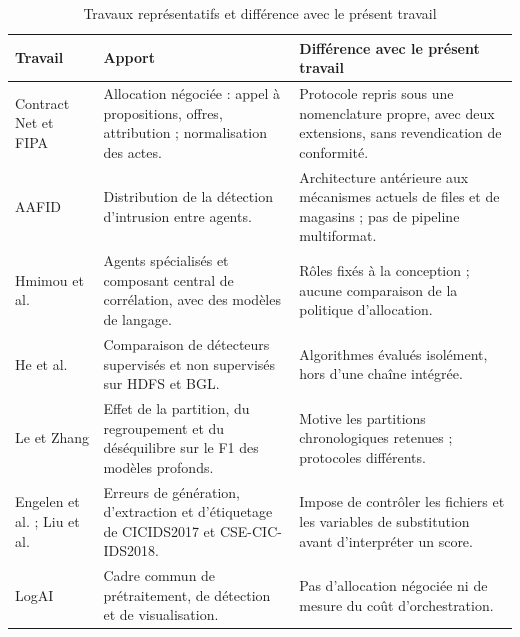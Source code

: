 \begin{table}[H]
\centering
\caption{Travaux représentatifs et différence avec le présent travail}
\label{tab:travaux-representatifs}
\scriptsize
\begin{tabularx}{\textwidth}{p{3cm}p{4.6cm}X}
\toprule
\textbf{Travail} & \textbf{Apport} & \textbf{Différence avec le présent travail} \\
\midrule
Contract Net et FIPA \cite{smith1980contract,fipa2002contractnet} &
Allocation négociée : appel à propositions, offres, attribution ; normalisation des actes. &
Protocole repris sous une nomenclature propre, avec deux extensions, sans revendication de conformité. \\
AAFID \cite{balasubramaniyan1998aafid} &
Distribution de la détection d'intrusion entre agents. &
Architecture antérieure aux mécanismes actuels de files et de magasins ; pas de pipeline multiformat. \\
Hmimou et al. \cite{hmimou2025multiagent} &
Agents spécialisés et composant central de corrélation, avec des modèles de langage. &
Rôles fixés à la conception ; aucune comparaison de la politique d'allocation. \\
He et al. \cite{he2016experience} &
Comparaison de détecteurs supervisés et non supervisés sur HDFS et BGL. &
Algorithmes évalués isolément, hors d'une chaîne intégrée. \\
Le et Zhang \cite{le2022logbased} &
Effet de la partition, du regroupement et du déséquilibre sur le F1 des modèles profonds. &
Motive les partitions chronologiques retenues ; protocoles différents. \\
Engelen et al. ; Liu et al. \cite{engelen2021troubleshooting,liu2022error} &
Erreurs de génération, d'extraction et d'étiquetage de CICIDS2017 et CSE-CIC-IDS2018. &
Impose de contrôler les fichiers et les variables de substitution avant d'interpréter un score. \\
LogAI \cite{cheng2023logai} &
Cadre commun de prétraitement, de détection et de visualisation. &
Pas d'allocation négociée ni de mesure du coût d'orchestration. \\
\bottomrule
\end{tabularx}
\end{table}

